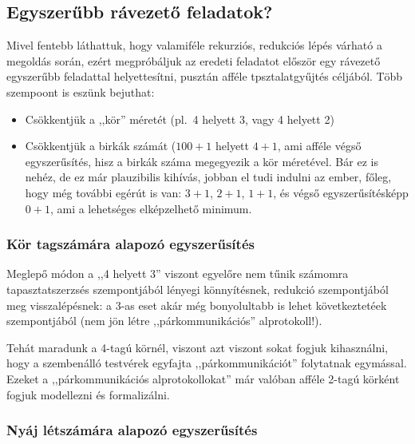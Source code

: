 \documentclass{article}
\begin{document}
	\subsection{Egyszerűbb rávezető feladatok?}

	Mivel fentebb láthattuk, hogy valamiféle rekurziós, redukciós lépés várható a megoldás során, ezért megpróbáljuk az eredeti feladatot először egy rávezető egyszerűbb feladattal helyettesítni, pusztán afféle tpsztalatgyűjtés céljából. Több szempoont is eszünk bejuthat: 

	\begin{itemize}
		\item Csökkentjük a ,,kör'' méretét (pl.~4 helyett 3, vagy 4 helyett 2)
		\item Csökkentjük a birkák számát ($100 + 1$ helyett $4 +1$, ami afféle végső egyszerűsítés, hisz a birkák száma megegyezik a kör méretével. Bár ez is nehéz, de ez már plauzibilis kihívás, jobban el tudi indulni az ember, főleg, hogy még további egérút is van: $3 +1$, $2 + 1$, $1 + 1$, és végső egyszerűsítésképp $0 + 1$, ami a lehetséges elképzelhető minimum.
	\end{itemize}

	\subsubsection{Kör tagszámára alapozó egyszerűsítés}

	Meglepő módon a ,,4 helyett 3'' viszont egyelőre nem tűnik számomra tapasztatszerzsés szempontjából  lényegi könnyítésnek, redukció szempontjából meg  visszalépésnek: a 3-as eset akár még bonyolultabb is lehet következtetéek szempontjából (nem jön létre ,,párkommunikációs'' alprotokoll!).

	Tehát maradunk a 4-tagú körnél, viszont azt viszont sokat fogjuk kihasználni, hogy a szembenálló testvérek egyfajta ,,párkommunikációt'' folytatnak egymással. Ezeket a ,,párkommunikációs alprotokollokat'' már valóban afféle 2-tagú körként fogjuk modellezni és formalizálni.%


	\subsubsection{Nyáj létszámára alapozó egyszerűsítés}
\end{document}
